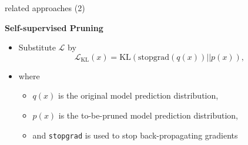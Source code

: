 
\begin{frame}{related approaches (2)}

\vfill

\textbf{Self-supervised Pruning} 

\begin{itemize}
	\item Substitute $\mathcal{L}$ by
							$$\mathcal{L}_{\mathrm{KL}}(x)=\mathrm{KL}(\mathrm{stopgrad}(q(x))||p(x)),$$
	\item where
			\begin{itemize}
				\item $q(x)$ is the original model prediction distribution,
				\item $p(x)$ is the to-be-pruned model prediction distribution,
				\item and \texttt{stopgrad} is used to stop back-propagating gradients
			\end{itemize}
\end{itemize}

\vfill
	
\end{frame}


\endlecture

